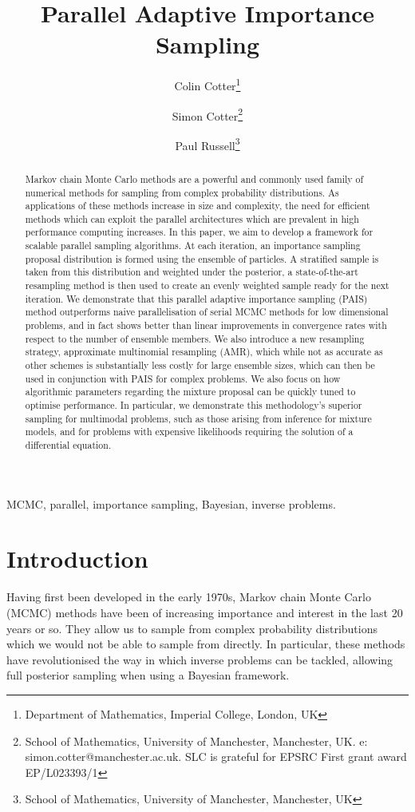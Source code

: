 \documentclass[final]{siamltex}
\author{Colin Cotter\thanks{Department of Mathematics, Imperial
    College, London, UK} \and Simon Cotter\thanks{School of
    Mathematics, University of Manchester, Manchester, UK. e:
    simon.cotter@manchester.ac.uk. SLC is grateful for EPSRC First
    grant award EP/L023393/1} \and Paul Russell\thanks{School of
    Mathematics, University of Manchester, Manchester, UK}}
\title{Parallel Adaptive Importance Sampling}
\begin{document}
\maketitle
\begin{abstract}
  Markov chain Monte Carlo methods are a powerful and commonly used
  family of numerical methods for sampling from complex probability
  distributions. As applications of these methods increase in size and
  complexity, the need for efficient methods which can exploit the
  parallel architectures which are prevalent in high performance
  computing increases. In this paper, we aim to develop a framework
  for scalable parallel sampling algorithms. At each iteration, an
  importance sampling proposal distribution is formed using the
  ensemble of particles. A stratified sample is taken from this
  distribution and weighted under the posterior, a state-of-the-art
  resampling method is then used to create an evenly weighted sample
  ready for the next iteration. We demonstrate that this parallel
  adaptive importance sampling (PAIS) method outperforms naive
  parallelisation of serial MCMC methods for low dimensional problems,
  and in fact shows
  better than linear improvements in convergence rates with respect to
  the number of ensemble members. We also introduce a new resampling
  strategy, approximate multinomial resampling (AMR), which while not
  as accurate as other schemes is substantially less costly for large
  ensemble sizes, which can then be used in conjunction with PAIS for
  complex problems. We also focus on how algorithmic parameters
  regarding the mixture proposal can be quickly tuned to optimise
  performance. In particular, we demonstrate this methodology's
  superior sampling for multimodal problems, such as those arising
  from inference for mixture models, and for problems with expensive
  likelihoods requiring the solution of a differential equation.
\end{abstract}
\begin{keywords}MCMC, parallel, importance sampling, Bayesian, inverse problems.
\end{keywords}
\section{Introduction}
Having first been developed in the early 1970s\cite{hastings1970monte}, Markov chain Monte Carlo (MCMC) methods have been of increasing
importance and interest in the last 20 years or so. They allow us to
sample from complex probability distributions which we would not be
able to sample from directly. In particular, these methods have
revolutionised the way in which inverse problems can be tackled,
allowing full posterior sampling when using a Bayesian framework. 
\end{document}
